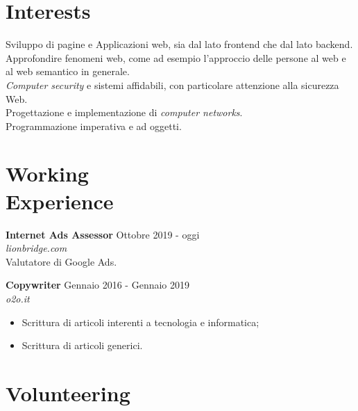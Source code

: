 \documentclass[margin, 10pt]{res}
\begin{document}
\begin{resume}

\section{Interests}
Sviluppo di pagine e Applicazioni web, sia dal lato frontend che dal lato backend. \\
Approfondire fenomeni web, come ad esempio l'approccio delle persone al web e al web semantico in generale. \\
\textit{Computer security} e sistemi affidabili, con particolare attenzione alla sicurezza Web. \\
Progettazione e implementazione di \textit{computer networks}. \\
Programmazione imperativa e ad oggetti.\\



 
\section{Working \\ Experience}

\textbf{Internet Ads Assessor} \hfill Ottobre 2019 - oggi \\
\textit{lionbridge.com} \\
Valutatore di Google Ads.

\textbf{Copywriter} \hfill Gennaio 2016 - Gennaio 2019 \\
\textit{o2o.it}
\begin{itemize}
\item Scrittura di articoli interenti a tecnologia e informatica;
\item Scrittura di articoli generici.
\end{itemize} 



\section{Volunteering}


\end{resume}
\end{document}
